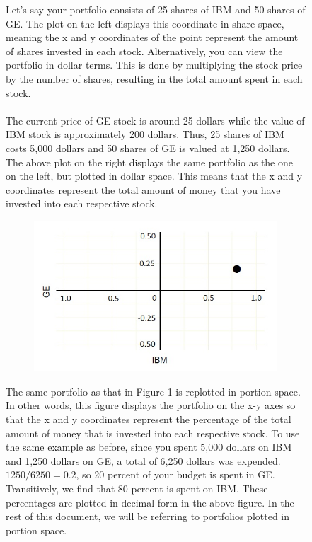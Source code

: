 \documentclass{article}\usepackage{graphicx, color}
\begin{document}
\begin{figure}[H]
\begin{subfigure}[b]{0.5\textwidth}
      \label{fig:dollarspace}
      \end{subfigure}
\caption{Let's say your portfolio consists of 25 shares of IBM and 50 shares of GE. The plot on the left displays this coordinate in share space, meaning the x and y coordinates of the point represent the amount of shares invested in each stock. Alternatively, you can view the portfolio in dollar terms. This is done by multiplying the stock price by the number of shares, resulting in the total amount spent in each stock. 
\\
\\
The current price of GE stock is around 25 dollars while the value of IBM stock is approximately 200 dollars. Thus, 25 shares of IBM costs 5,000 dollars and 50 shares of GE is valued at 1,250 dollars. The above plot on the right displays the same portfolio as the one on the left, but plotted in dollar space. This means that the x and y coordinates represent the total amount of money that you have invested into each respective stock.}
\end{figure}

\begin{figure}[H]
  \begin{subfigure}[b]{1.0\textwidth}
    \centering
    \includegraphics[width=\textwidth]{portionspace}
    \label{fig:portionspace}
  \end{subfigure}
\caption{The same portfolio as that in Figure 1 is replotted in portion space. In other words, this figure displays the portfolio on the x-y axes so that the x and y coordinates represent the percentage of the total amount of money that is invested into each respective stock. To use the same example as before, since you spent 5,000 dollars on IBM and 1,250 dollars on GE, a total of 6,250 dollars was expended. $1250/6250 = 0.2$, so 20 percent of your budget is spent in GE. Transitively, we find that 80 percent is spent on IBM. These percentages are plotted in decimal form in the above figure. In the rest of this document, we will be referring to portfolios plotted in portion space.}
\end{figure}
\end{document}
